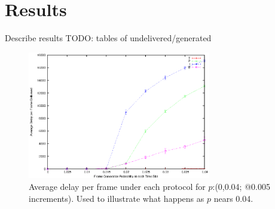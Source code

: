 \documentclass[twocolumn]{article}
\begin{document}




\section*{Results}

Describe results
TODO: tables of undelivered/generated


\begin{figure}
    \centering
    \includegraphics[width=8cm]{plots/delay_big.eps}
    \caption{\footnotesize  Average delay per frame under each protocol for $p$:(0,0.04; @0.005 increments). Used to illustrate what happens as $p$ nears 0.04.}
    \label{fig:delay_big}
\end{figure}
\end{document}
